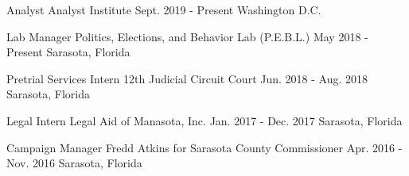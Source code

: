 

\begin{cventries}

    \cventry
      {Analyst} %
      {Analyst Institute} %
      {Sept. 2019 - Present} %
      {Washington D.C.} %
      {}

  \vspace{-.25cm}

  \cventry
    {Lab Manager} %
    {Politics, Elections, and Behavior Lab (P.E.B.L.)} %
    {May 2018 - Present} %
    {Sarasota, Florida} %
    {}

\vspace{-.25cm}
  \cventry
    {Pretrial Services Intern} %
    {12th Judicial Circuit Court} %
    {Jun. 2018 - Aug. 2018} %
    {Sarasota, Florida} %
    {}

\vspace{-.25cm}
  \cventry
    {Legal Intern} %
    {Legal Aid of Manasota, Inc.} %
    {Jan. 2017 - Dec. 2017} %
    {Sarasota, Florida} %
    {}

\vspace{-.25cm}
  \cventry
    {Campaign Manager} %
    {Fredd Atkins for Sarasota County Commissioner} %
    {Apr. 2016 - Nov. 2016} %
    {Sarasota, Florida} %
    {}

\vspace{-.25cm}
\end{cventries}

